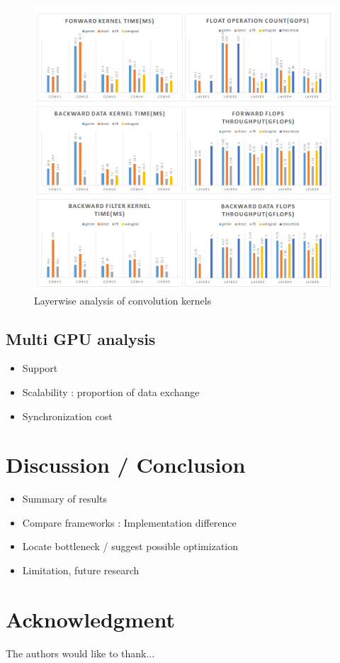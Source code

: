 \documentclass[conference]{IEEEtran}
\begin{document}
\begin{figure}
  \centering
  \includegraphics[width=\linewidth]{./figures/layerwise_bench}
  \caption{Layerwise analysis of convolution kernels}
  \label{fig_layerwise}
\end{figure}


\subsection{Multi GPU analysis}

\begin{itemize}
  \item Support
  \item Scalability : proportion of data exchange
  \item Synchronization cost
\end{itemize}

\section{Discussion / Conclusion}

\begin{itemize}
  \item Summary of results
  \item Compare frameworks : Implementation difference
  \item Locate bottleneck / suggest possible optimization
  \item Limitation, future research
\end{itemize}

\section*{Acknowledgment}

The authors would like to thank...



\nocite{*}
\end{document}
